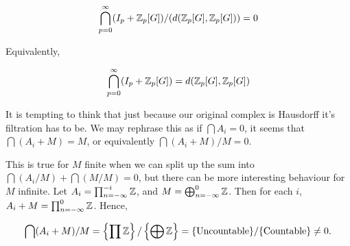 $$\bigcap_{p=0}^{\infty} (I_p+\mathbb Z_p[G])/(d(\mathbb Z_p[G],\mathbb Z_p[G])) = 0$$

Equivalently, 

$$\bigcap_{p=0}^{\infty} (I_p+\mathbb Z_p[G]) =d(\mathbb Z_p[G],\mathbb Z_p[G])$$

It is tempting to think that just because our original complex is Hausdorff it's filtration has to be. We may rephrase this as if $\bigcap A_i = 0$, it seems that $\bigcap (A_i + M) = M$, or equivalently $\bigcap (A_i + M)/M = 0$.

This is true for $M$ finite when we can split up the sum into  $\bigcap (A_i /M) + \bigcap (M/M) = 0$, but there can be more interesting behaviour for $M$ infinite. Let $A_i = \prod_{n= - \infty}^{-i} \mathbb Z$, and $M = \bigoplus_{n= -\infty}^0\mathbb Z$. Then for each $i$, $A_i + M = \prod_{n= - \infty}^{0} \mathbb Z$. Hence, 

$$\bigcap (A_i + M)/M =  \left\{ \prod \mathbb Z \right\} / \left\{ \bigoplus \mathbb Z \right\} = \{\text{Uncountable}\} /\{\text{Countable}\} \neq 0.$$ 

